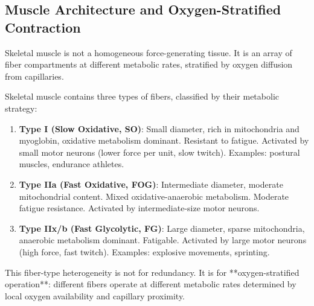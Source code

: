 \subsection{Muscle Architecture and Oxygen-Stratified Contraction}
\label{subsec:muscle-architecture}

Skeletal muscle is not a homogeneous force-generating tissue. It is an array of fiber compartments at different metabolic rates, stratified by oxygen diffusion from capillaries.

\begin{definition}
\label{def:fiber-types}
Skeletal muscle contains three types of fibers, classified by their metabolic strategy:

\begin{enumerate}[label=(\Roman*), noitemsep]
\item \textbf{Type I (Slow Oxidative, SO)}: Small diameter, rich in mitochondria and myoglobin, oxidative metabolism dominant. Resistant to fatigue. Activated by small motor neurons (lower force per unit, slow twitch). Examples: postural muscles, endurance athletes.

\item \textbf{Type IIa (Fast Oxidative, FOG)}: Intermediate diameter, moderate mitochondrial content. Mixed oxidative-anaerobic metabolism. Moderate fatigue resistance. Activated by intermediate-size motor neurons.

\item \textbf{Type IIx/b (Fast Glycolytic, FG)}: Large diameter, sparse mitochondria, anaerobic metabolism dominant. Fatigable. Activated by large motor neurons (high force, fast twitch). Examples: explosive movements, sprinting.
\end{enumerate}

This fiber-type heterogeneity is not for redundancy. It is for **oxygen-stratified operation**: different fibers operate at different metabolic rates determined by local oxygen availability and capillary proximity.
\end{definition}

